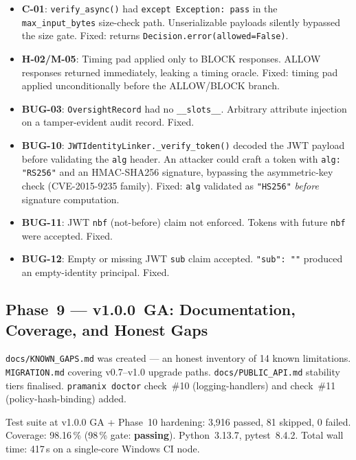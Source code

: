 \documentclass[12pt,a4paper,oneside]{report}
\newcommand{\fname}[1]{\texttt{#1}}          %
\newcommand{\code}[1]{\texttt{#1}}           %
\begin{document}
\begin{itemize}
  \item \textbf{C-01}: \code{verify\_async()} had \code{except Exception: pass}
        in the \code{max\_input\_bytes} size-check path. Unserializable payloads
        silently bypassed the size gate. Fixed: returns
        \code{Decision.error(allowed=False)}.

  \item \textbf{H-02/M-05}: Timing pad applied only to BLOCK responses. ALLOW
        responses returned immediately, leaking a timing oracle. Fixed: timing
        pad applied unconditionally before the ALLOW/BLOCK branch.

  \item \textbf{BUG-03}: \code{OversightRecord} had no \code{\_\_slots\_\_}.
        Arbitrary attribute injection on a tamper-evident audit record. Fixed.

  \item \textbf{BUG-10}: \code{JWTIdentityLinker.\_verify\_token()} decoded the
        JWT payload before validating the \code{alg} header. An attacker could
        craft a token with \code{alg: "RS256"} and an HMAC-SHA256 signature,
        bypassing the asymmetric-key check (CVE-2015-9235 family). Fixed:
        \code{alg} validated as \code{"HS256"} \emph{before} signature
        computation.

  \item \textbf{BUG-11}: JWT \code{nbf} (not-before) claim not enforced.
        Tokens with future \code{nbf} were accepted. Fixed.

  \item \textbf{BUG-12}: Empty or missing JWT \code{sub} claim accepted.
        \code{"sub": ""} produced an empty-identity principal. Fixed.
\end{itemize}

\subsection{Phase~9 --- v1.0.0~GA: Documentation, Coverage, and Honest Gaps}

\fname{docs/KNOWN\_GAPS.md} was created --- an honest inventory of 14 known
limitations. \fname{MIGRATION.md} covering v0.7--v1.0 upgrade paths.
\fname{docs/PUBLIC\_API.md} stability tiers finalised. \code{pramanix doctor}
check~\#10 (logging-handlers) and check~\#11 (policy-hash-binding) added.

Test suite at v1.0.0 GA + Phase~10 hardening: 3,916 passed, 81 skipped, 0
failed.  Coverage: 98.16\,\% (98\,\% gate: \textbf{passing}).  Python~3.13.7,
pytest~8.4.2.  Total wall time: 417\,s on a single-core Windows CI node.
\end{document}
